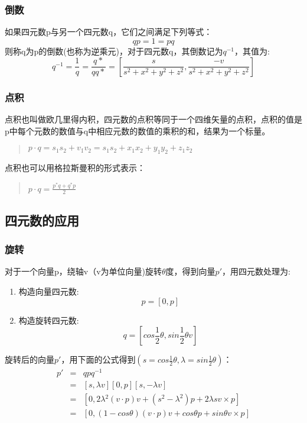 \documentclass[a4paper,10pt]{article}
\begin{document}
\begin{CJK}{UTF8}{song}
\subsubsection{倒数}
如果四元数p与另一个四元数q，它们之间满足下列等式：
\begin{displaymath}
qp=1=pq
\end{displaymath}
则称q为p的倒数(也称为逆乘元)，对于四元数q，其倒数记为$q^{-1}$，其值为:
\begin{displaymath}
q^{-1}=\frac{1}{q}=\frac{q*}{qq*}=[\frac{s}{s^2+x^2+y^2+z^2},\frac{-v}{s^2+x^2+y^2+z^2}]
\end{displaymath}


\subsubsection{点积}
点积也叫做欧几里得内积，四元数的点积等同于一个四维矢量的点积，点积的值是p中每个元数的数值与q中相应元数的数值的乘积的和，结果为一个标量。
\begin{quote}
$p\cdot q=s_{1}s_{2}+v_{1}\dot{}v_{2}=s_{1}s_{2}+x_{1}x_{2}+y_{1}y_{2}+z_{1}z_{2}$
\end{quote}
点积也可以用格拉斯曼积的形式表示：
\begin{quote}
\begin{math}
p\cdot q = \frac{p^{*}q+q^{*}p}{2}
\end{math}
\end{quote}


\subsection{四元数的应用}
\subsubsection{旋转}
对于一个向量p，绕轴v（v为单位向量)旋转$\theta$度，得到向量$p'$，用四元数处理为:
\begin{enumerate}
\item 构造向量四元数:
\begin{displaymath}
p=[0,p]
\end{displaymath}
\item 构造旋转四元数:
$$q=[cos\frac{1}{2}\theta,sin\frac{1}{2}\theta{}v]$$
\end{enumerate}
旋转后的向量$p'$，用下面的公式得到$(s=cos\frac{1}{2}\theta,\lambda{}=sin\frac{1}{2}\theta{})$：
\begin{displaymath}
\begin{array}{ccl}
 p' & = &  qpq^{-1} \\
    & = &  [s,\lambda{}v][0,p][s,-\lambda{}v] \\
    & = &  [0,2\lambda{}^2(v\cdot{}p)v+(s^2-\lambda^2)p+2\lambda{}sv\times{}p] \\
    & = &  [0,(1-cos\theta)(v\cdot{}p)v+cos\theta{}p+sin\theta{}v\times{}p]
\end{array}
\end{displaymath}

\end{CJK}
\end{document}
